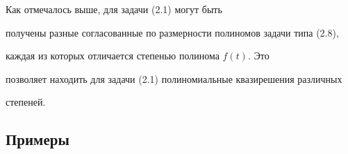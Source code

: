 \begin{notes}


Как отмечалось выше, для задачи (2.1) могут быть


получены разные согласованные по размерности полиномов задачи типа (2.8),


каждая из которых отличается степенью полинома $f(t)$. Это


позволяет находить для задачи (2.1) полиномиальные квазирешения различных


степеней.


\end{notes}





\subsection{Примеры}





